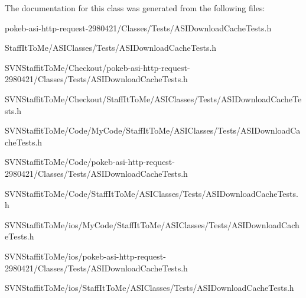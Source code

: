 \-The documentation for this class was generated from the following files\-:\begin{DoxyCompactItemize}
\item 
pokeb-\/asi-\/http-\/request-\/2980421/\-Classes/\-Tests/\-A\-S\-I\-Download\-Cache\-Tests.\-h\item 
\-Staff\-It\-To\-Me/\-A\-S\-I\-Classes/\-Tests/\-A\-S\-I\-Download\-Cache\-Tests.\-h\item 
\-S\-V\-N\-Staffit\-To\-Me/\-Checkout/pokeb-\/asi-\/http-\/request-\/2980421/\-Classes/\-Tests/\-A\-S\-I\-Download\-Cache\-Tests.\-h\item 
\-S\-V\-N\-Staffit\-To\-Me/\-Checkout/\-Staff\-It\-To\-Me/\-A\-S\-I\-Classes/\-Tests/\-A\-S\-I\-Download\-Cache\-Tests.\-h\item 
\-S\-V\-N\-Staffit\-To\-Me/\-Code/\-My\-Code/\-Staff\-It\-To\-Me/\-A\-S\-I\-Classes/\-Tests/\-A\-S\-I\-Download\-Cache\-Tests.\-h\item 
\-S\-V\-N\-Staffit\-To\-Me/\-Code/pokeb-\/asi-\/http-\/request-\/2980421/\-Classes/\-Tests/\-A\-S\-I\-Download\-Cache\-Tests.\-h\item 
\-S\-V\-N\-Staffit\-To\-Me/\-Code/\-Staff\-It\-To\-Me/\-A\-S\-I\-Classes/\-Tests/\-A\-S\-I\-Download\-Cache\-Tests.\-h\item 
\-S\-V\-N\-Staffit\-To\-Me/ios/\-My\-Code/\-Staff\-It\-To\-Me/\-A\-S\-I\-Classes/\-Tests/\-A\-S\-I\-Download\-Cache\-Tests.\-h\item 
\-S\-V\-N\-Staffit\-To\-Me/ios/pokeb-\/asi-\/http-\/request-\/2980421/\-Classes/\-Tests/\-A\-S\-I\-Download\-Cache\-Tests.\-h\item 
\-S\-V\-N\-Staffit\-To\-Me/ios/\-Staff\-It\-To\-Me/\-A\-S\-I\-Classes/\-Tests/\-A\-S\-I\-Download\-Cache\-Tests.\-h\end{DoxyCompactItemize}
